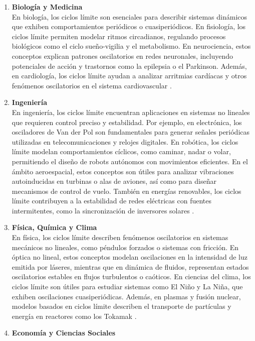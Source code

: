 \begin{enumerate}
	\item \textbf{Biología y Medicina}\\

	En biología, los ciclos límite son esenciales para describir sistemas dinámicos que exhiben comportamientos periódicos o cuasiperiódicos. En fisiología, los ciclos límite permiten modelar ritmos circadianos, regulando procesos biológicos como el ciclo sueño-vigilia y el metabolismo. En neurociencia, estos conceptos explican patrones oscilatorios en redes neuronales, incluyendo potenciales de acción y trastornos como la epilepsia o el Parkinson. Además, en cardiología, los ciclos límite ayudan a analizar arritmias cardíacas y otros fenómenos oscilatorios en el sistema cardiovascular \cite{murray2002mathematical}.
	\item \textbf{Ingeniería}\\

	En ingeniería, los ciclos límite encuentran aplicaciones en sistemas no lineales que requieren control preciso y estabilidad. Por ejemplo, en electrónica, los osciladores de Van der Pol son fundamentales para generar señales periódicas utilizadas en telecomunicaciones y relojes digitales. En robótica, los ciclos límite modelan comportamientos cíclicos, como caminar, nadar o volar, permitiendo el diseño de robots autónomos con movimientos eficientes. En el ámbito aeroespacial, estos conceptos son útiles para analizar vibraciones autoinducidas en turbinas o alas de aviones, así como para diseñar mecanismos de control de vuelo. También en energías renovables, los ciclos límite contribuyen a la estabilidad de redes eléctricas con fuentes intermitentes, como la sincronización de inversores solares \cite{khalil2002nonlinear}.
	\item \textbf{Física, Química y Clima}\\

	En física, los ciclos límite describen fenómenos oscilatorios en sistemas mecánicos no lineales, como péndulos forzados o sistemas con fricción. En óptica no lineal, estos conceptos modelan oscilaciones en la intensidad de luz emitida por láseres, mientras que en dinámica de fluidos, representan estados oscilatorios estables en flujos turbulentos o caóticos. En ciencias del clima, los ciclos límite son útiles para estudiar sistemas como El Niño y La Niña, que exhiben oscilaciones cuasiperiódicas. Además, en plasmas y fusión nuclear, modelos basados en ciclos límite describen el transporte de partículas y energía en reactores como los Tokamak \cite{guckenheimer1983nonlinear}.
	\item \textbf{Economía y Ciencias Sociales}\\


\end{enumerate}
